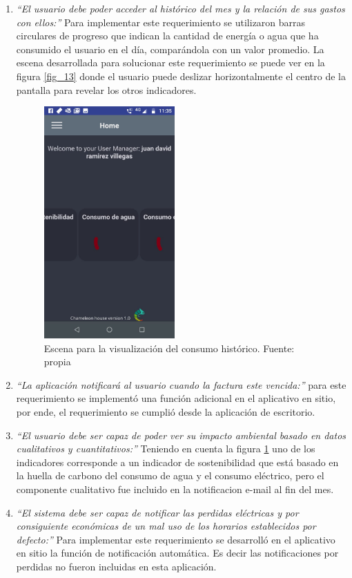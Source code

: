 \begin{enumerate}
	\item \textit{``El usuario debe poder acceder al histórico del mes y la relación de sus gastos con ellos:''} Para implementar este requerimiento se utilizaron barras circulares de progreso que indican la cantidad de energía o agua que ha consumido el usuario en el día, comparándola con un valor promedio. La escena desarrollada para solucionar este requerimiento se puede ver en la figura \ref{fig_13} donde el usuario puede deslizar horizontalmente el centro de la pantalla para revelar los otros indicadores.
	\begin{figure}[htbp]
		\centerline{\includegraphics[width=5cm]{./figuras/mobile_home.jpeg}}
		\caption{Escena para la visualización del consumo histórico. Fuente: propia}
		\label{fig_14}
	\end{figure}
	\item  \textit{``La aplicación notificará al usuario cuando la factura este vencida:''} para este requerimiento se implementó una función adicional en el aplicativo en sitio, por ende, el requerimiento se cumplió desde la aplicación de escritorio.
	
	\item \textit{``El usuario debe ser capaz de poder ver su impacto ambiental basado en datos cualitativos y cuantitativos:''} Teniendo en cuenta la figura \ref{fig_14} uno de los indicadores corresponde a un indicador de sostenibilidad que está basado en la huella de carbono del consumo de agua y el consumo eléctrico, pero el componente cualitativo fue incluido en la notificacion e-mail al fin del mes.
	
	\item \textit{``El sistema debe ser capaz de notificar las perdidas eléctricas y por consiguiente económicas de un mal uso de los horarios establecidos por defecto:''} Para implementar este requerimiento se desarrolló en el aplicativo en sitio la función de notificación automática. Es decir las notificaciones por perdidas no fueron incluidas en esta aplicación.
	
\end{enumerate}


